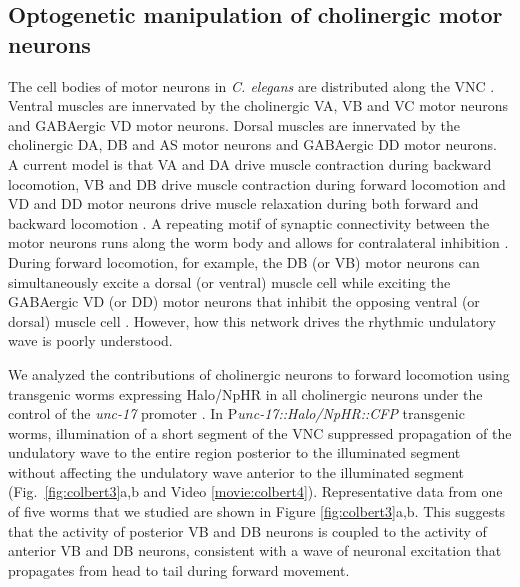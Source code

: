 \subsection{Optogenetic manipulation of cholinergic motor neurons}
The cell bodies of motor neurons in \textit{C. elegans} are distributed along the VNC \citep{von_stetina_motor_2006,wicks_dynamic_1996}. Ventral muscles are innervated by the cholinergic VA, VB and VC motor neurons and GABAergic VD motor neurons. Dorsal muscles are innervated by the cholinergic DA, DB and AS motor neurons and GABAergic DD motor neurons\citep{white_structure_1976,chen_wiring_2006}. A current model is that VA and DA drive muscle contraction during backward locomotion, VB and DB drive muscle contraction during forward locomotion and VD and DD motor neurons drive muscle relaxation during both forward and backward locomotion \citep{wicks_dynamic_1996,von_stetina_motor_2006,haspel_motoneurons_2010}. A repeating motif of synaptic connectivity between the motor neurons runs along the worm body and allows for contralateral inhibition \citep{von_stetina_motor_2006}. During forward locomotion, for example, the DB (or VB) motor neurons can simultaneously excite a dorsal (or ventral) muscle cell while exciting the GABAergic VD (or DD) motor neurons that inhibit the opposing ventral (or dorsal) muscle cell \citep{white_structure_1976,chen_wiring_2006}. However, how this network drives the rhythmic undulatory wave is poorly understood.

We analyzed the contributions of cholinergic neurons to forward locomotion using transgenic worms expressing Halo/NpHR in all cholinergic neurons under the control of the \textit{unc-17} promoter \citep{roghani_molecular_1994}. In P\textit{unc-17::Halo/NpHR::CFP} transgenic worms, illumination of a short segment of the VNC suppressed propagation of the undulatory wave to the entire region posterior to the illuminated segment without affecting the undulatory wave anterior to the illuminated segment (Fig.~\ref{fig:colbert3}a,b and Video \ref{movie:colbert4}). Representative data from one of five worms that we studied are shown in Figure \ref{fig:colbert3}a,b. This suggests that the activity of posterior VB and DB neurons is coupled to the activity of anterior VB and DB neurons, consistent with a wave of neuronal excitation that propagates from head to tail during forward movement.

